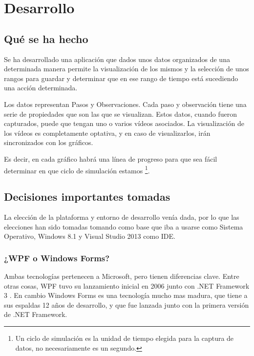 \chapter{Desarrollo}

\section{Qu\'{e} se ha hecho}
Se ha desarrollado una aplicaci\'{o}n que dados unos datos organizados
de una determinada manera permite la visualizaci\'{o}n de los mismos y
la selecci\'{o}n de unos rangos para guardar y determinar que en ese rango de tiempo
est\'{a} sucediendo una acci\'{o}n determinada.

Los datos representan Pasos y Observaciones. Cada paso y observaci\'{o}n tiene una serie
de propiedades que son las que se visualizan. Estos datos, cuando fueron capturados, puede
que tengan uno o varios v\'{i}deos asociados. La visualizaci\'{o}n de los v\'{i}deos es completamente
optativa, y en caso de visualizarlos, ir\'{a}n sincronizados con los gr\'{a}ficos.

Es decir, en cada gr\'{a}fico habr\'{a} una l\'{i}nea de progreso para que sea f\'{a}cil determinar en que ciclo
de simulaci\'{o}n estamos \footnote{Un ciclo de simulaci\'{o}n es la unidad de tiempo elegida para la captura de datos, no
    necesariamente es un segundo.}.

\section{Decisiones importantes tomadas}
La elecci\'{o}n de la plataforma y entorno de desarrollo ven\'{i}a dada, por lo que las elecciones han sido tomadas
tomando como base que iba a usarse como Sistema Operativo, Windows 8.1 y Visual Studio 2013 como IDE.

\subsection{¿WPF o Windows Forms?}
Ambas tecnolog\'{i}as pertenecen a Microsoft, pero tienen diferencias clave. Entre otras cosas, WPF tuvo su lanzamiento inicial en 2006
junto con .NET Framework 3 \cite{WPF:Overview}. En cambio Windows Forms es una tecnolog\'{i}a 
mucho mas madura, que tiene a sus espaldas 12 años de desarrollo, y que fue lanzada junto con la primera versi\'{o}n de .NET Framework.

